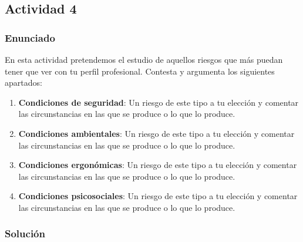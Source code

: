 \subsection{Actividad 4}

\subsubsection{Enunciado}

En esta actividad pretendemos el estudio de aquellos riesgos que más puedan tener que ver con tu perfil profesional. Contesta y argumenta los siguientes apartados:

\begin{enumerate}[label=\alph*)]
    \item \textbf{Condiciones de seguridad}: Un riesgo de este tipo a tu elección y comentar las circunstancias en las que se produce o lo que lo produce.
    \item \textbf{Condiciones ambientales}: Un riesgo de este tipo a tu elección y comentar las circunstancias en las que se produce o lo que lo produce.
    \item \textbf{Condiciones ergonómicas}: Un riesgo de este tipo a tu elección y comentar las circunstancias en las que se produce o lo que lo produce.
    \item \textbf{Condiciones psicosociales}: Un riesgo de este tipo a tu elección y comentar las circunstancias en las que se produce o lo que lo produce.
\end{enumerate}

\subsubsection{Solución}

